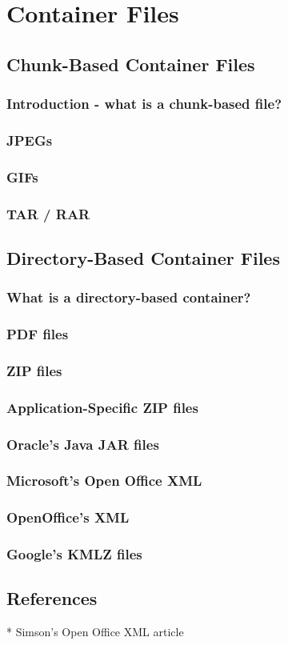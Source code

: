 \chapter{Container Files}
\section{Chunk-Based Container Files}
\subsection{Introduction - what is a chunk-based file?}
\subsection{JPEGs}
\subsection{GIFs}
\subsection{TAR / RAR}
\section{Directory-Based Container Files}
\subsection{What is a directory-based container?}
\subsection{PDF files}
\subsection{ZIP files}
\subsection{Application-Specific ZIP files}

\subsection{Oracle's Java JAR files}
\subsection{Microsoft's Open Office XML}
\subsection{OpenOffice's XML}
\subsection{Google's KMLZ files}
\section{References}
* Simson's Open Office XML article

